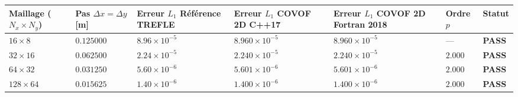 \documentclass[
  10pt,
]{article}
\newcounter{none} %
\begin{document}
{\def\LTcaptype{none} %
\begin{longtable}[]{@{}
  >{\centering\arraybackslash}p{}
  >{\centering\arraybackslash}p{}
  >{\centering\arraybackslash}p{}
  >{\centering\arraybackslash}p{}
  >{\centering\arraybackslash}p{}
  >{\centering\arraybackslash}p{}
  >{\centering\arraybackslash}p{}@{}}
\toprule\noalign{}
\begin{minipage}[b]{\linewidth}\centering
Maillage (\(N_x \times N_y\))
\end{minipage} & \begin{minipage}[b]{\linewidth}\centering
Pas \(\Delta x = \Delta y\) {[}m{]}
\end{minipage} & \begin{minipage}[b]{\linewidth}\centering
Erreur \(L_1\) Référence TREFLE
\end{minipage} & \begin{minipage}[b]{\linewidth}\centering
Erreur \(L_1\) COVOF 2D C++17
\end{minipage} & \begin{minipage}[b]{\linewidth}\centering
Erreur \(L_1\) COVOF 2D Fortran 2018
\end{minipage} & \begin{minipage}[b]{\linewidth}\centering
Ordre \(p\)
\end{minipage} & \begin{minipage}[b]{\linewidth}\centering
Statut
\end{minipage} \\
\midrule\noalign{}
\endhead
\bottomrule\noalign{}
\endlastfoot
\(16 \times 8\) & \(0.125000\) & \(8.96 \times 10^{-5}\) &
\textbf{\(8.960 \times 10^{-5}\)} & \textbf{\(8.960 \times 10^{-5}\)} &
--- & \textbf{PASS} \\
\(32 \times 16\) & \(0.062500\) & \(2.24 \times 10^{-5}\) &
\textbf{\(2.240 \times 10^{-5}\)} & \textbf{\(2.240 \times 10^{-5}\)} &
\textbf{\(2.000\)} & \textbf{PASS} \\
\(64 \times 32\) & \(0.031250\) & \(5.60 \times 10^{-6}\) &
\textbf{\(5.601 \times 10^{-6}\)} & \textbf{\(5.601 \times 10^{-6}\)} &
\textbf{\(2.000\)} & \textbf{PASS} \\
\(128 \times 64\) & \(0.015625\) & \(1.40 \times 10^{-6}\) &
\textbf{\(1.400 \times 10^{-6}\)} & \textbf{\(1.400 \times 10^{-6}\)} &
\textbf{\(2.000\)} & \textbf{PASS} \\
\end{longtable}
}
\end{document}
